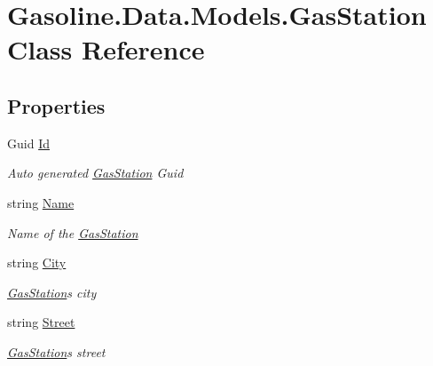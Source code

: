 \hypertarget{class_gasoline_1_1_data_1_1_models_1_1_gas_station}{}\section{Gasoline.\+Data.\+Models.\+Gas\+Station Class Reference}
\label{class_gasoline_1_1_data_1_1_models_1_1_gas_station}
\subsection*{Properties}
\begin{DoxyCompactItemize}
\item 
Guid \mbox{\hyperlink{class_gasoline_1_1_data_1_1_models_1_1_gas_station_a9d4760a89b8a64b387f6b14d02aa876d}{Id}}
\begin{DoxyCompactList}\small\item\em Auto generated \mbox{\hyperlink{class_gasoline_1_1_data_1_1_models_1_1_gas_station}{Gas\+Station}} Guid \end{DoxyCompactList}\item 
string \mbox{\hyperlink{class_gasoline_1_1_data_1_1_models_1_1_gas_station_a13a8f1f8a9dfa3a93741e1b6f9817eb6}{Name}}
\begin{DoxyCompactList}\small\item\em Name of the \mbox{\hyperlink{class_gasoline_1_1_data_1_1_models_1_1_gas_station}{Gas\+Station}} \end{DoxyCompactList}\item 
string \mbox{\hyperlink{class_gasoline_1_1_data_1_1_models_1_1_gas_station_a9033f70b9e035a061f48ec316fb9b23f}{City}}
\begin{DoxyCompactList}\small\item\em \mbox{\hyperlink{class_gasoline_1_1_data_1_1_models_1_1_gas_station}{Gas\+Station}}\textquotesingle{}s city \end{DoxyCompactList}\item 
string \mbox{\hyperlink{class_gasoline_1_1_data_1_1_models_1_1_gas_station_a5921248ca0bc7059f3e95589d94e2472}{Street}}
\begin{DoxyCompactList}\small\item\em \mbox{\hyperlink{class_gasoline_1_1_data_1_1_models_1_1_gas_station}{Gas\+Station}}\textquotesingle{}s street \end{DoxyCompactList}\item 

\end{DoxyCompactItemize}
